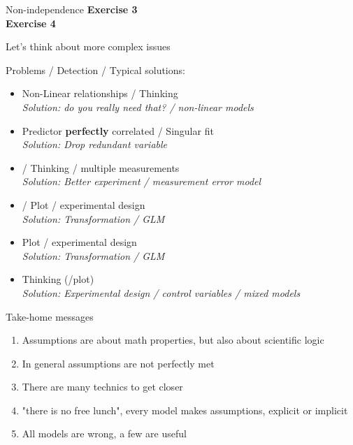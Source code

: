 \documentclass{beamer}\usepackage[]{graphicx}\usepackage[]{color}
\begin{document}
\begin{frame}{Non-independence}
\centering
\textbf{Exercise 3\\ \vfill}
\pause
\textbf{Exercise 4}
\end{frame}

\begin{frame}{Let's think about more complex issues}

\end{frame}

\begin{frame}{Problems / {\color{blue!50}Detection} / {\color{green!50!black}Typical solutions:}}
   \begin{block}{}
     \begin{itemize}[<+->]
      \item Non-Linear relationships / {\color{blue!50} Thinking}\\ \textit{\color{green!50!black}Solution: do you really need that? / non-linear models}
      \item Predictor \textbf{perfectly} correlated / {\color{blue!50} Singular fit}\\ \textit{\color{green!50!black}Solution: Drop redundant variable}
       \item {\color{red!20!black}{Error in predictors}} / {\color{blue!50} Thinking / multiple measurements} \\ \textit{\color{green!50!black}Solution: Better experiment / measurement error model}
       \item {} / {\color{blue!50} Plot / experimental design}\\ \textit{\color{green!50!black}Solution: Transformation / GLM}
       \item {\color{red!70!black}{Changing error variance}} {\color{blue!50} Plot / experimental design}\\ \textit{\color{green!50!black}Solution: Transformation / GLM}
       \item {\color{red!99!black}{Correlated errors}} {\color{blue!50} Thinking (/plot)}\\ \textit{\color{green!50!black}Solution: Experimental design / control variables / mixed models}
     \end{itemize}
 \end{block}
\end{frame}


\begin{frame}{Take-home messages}
  \begin{enumerate}
    \item Assumptions are about math properties, but also about scientific logic
    \item In general assumptions are not perfectly met
    \item There are many technics to get closer
    \item "there is no free lunch", every model makes assumptions, explicit or implicit
    \item All models are wrong, a few are useful
  \end{enumerate}
\end{frame}
\end{document}
